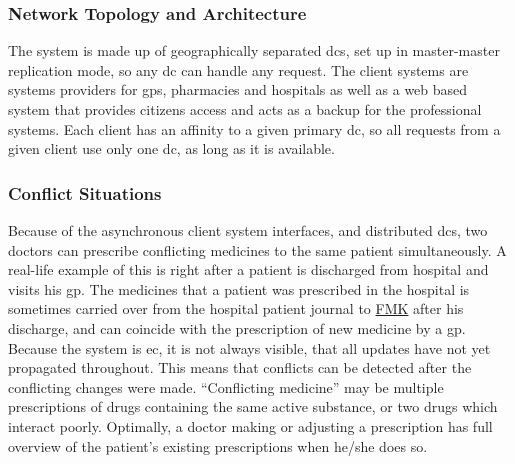 \subsubsection{Network Topology and Architecture }
The system is made up of geographically separated \glspl{dc}, set up in master-master replication mode, so any \gls{dc} can handle any request. The client systems are systems providers for \glspl{gp}, pharmacies and hospitals as well as a web based system that provides citizens access and acts as a backup for the professional systems. Each client has an affinity to a given primary \gls{dc}, so all requests from a given client use only one \gls{dc}, as long as it is available.


\subsubsection{Conflict Situations}
Because of the asynchronous client system interfaces, and distributed \glspl{dc}, two doctors can prescribe conflicting medicines to the same patient simultaneously. A real-life example of this is right after a patient is discharged from hospital and visits his \gls{gp}. The medicines that a patient was prescribed in the hospital is sometimes carried over from the hospital patient journal to \href{https://www.trifork.com/news/a-prestigious-prize-trifork-public}{FMK} after his discharge, and can coincide with the prescription of new medicine by a \gls{gp}. Because the system is \gls{ec}, it is not always visible, that all updates have not yet propagated throughout. This means that conflicts can be detected after the conflicting changes were made. \textquotedblleft Conflicting medicine\textquotedblright{} may be multiple prescriptions of drugs containing the same active substance, or two drugs which interact poorly. Optimally, a doctor making or adjusting a prescription has full overview of the patient\textquoteright s existing prescriptions when he/she does so.


